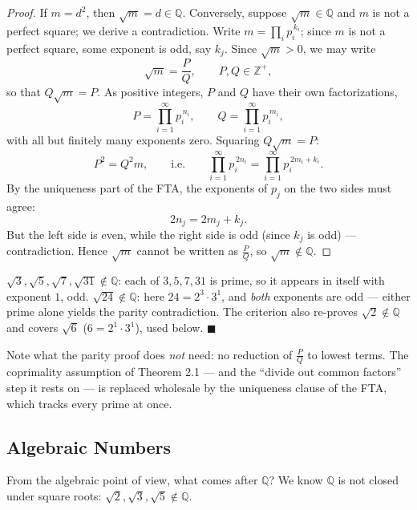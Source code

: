 \documentclass[11pt]{report}
\begin{document}
\begin{proof}
If $m = d^2$, then $\sqrt m = d \in \mathbb{Q}$. Conversely, suppose $\sqrt m \in \mathbb{Q}$ and $m$ is not a perfect square; we derive a contradiction. Write $m = \prod_i p_i^{\,k_i}$; since $m$ is not a perfect square, some exponent is odd, say $k_j$. Since $\sqrt m > 0$, we may write
\[
\sqrt m = \frac{P}{Q}, \qquad P, Q \in \mathbb{Z}^+,
\]
so that $Q\sqrt m = P$. As positive integers, $P$ and $Q$ have their own factorizations,
\[
P = \prod_{i=1}^\infty p_i^{\,n_i}, \qquad Q = \prod_{i=1}^\infty p_i^{\,m_i},
\]
with all but finitely many exponents zero. Squaring $Q\sqrt m = P$:
\[
P^2 = Q^2 m, \qquad \text{i.e.} \qquad \prod_{i=1}^\infty p_i^{\,2n_i} = \prod_{i=1}^\infty p_i^{\,2m_i + k_i}.
\]
By the uniqueness part of the FTA, the exponents of $p_j$ on the two sides must agree:
\[
2n_j = 2m_j + k_j.
\]
But the left side is even, while the right side is odd (since $k_j$ is odd) --- contradiction. Hence $\sqrt m$ cannot be written as $\tfrac PQ$, so $\sqrt m \notin \mathbb{Q}$.
\end{proof}

\begin{exbox}[Instances (HW)]
$\sqrt3, \sqrt5, \sqrt7, \sqrt{31} \notin \mathbb{Q}$: each of $3, 5, 7, 31$ is prime, so it appears in itself with exponent $1$, odd. $\sqrt{24} \notin \mathbb{Q}$: here $24 = 2^3 \cdot 3^1$, and \emph{both} exponents are odd --- either prime alone yields the parity contradiction. The criterion also re-proves $\sqrt2 \notin \mathbb{Q}$ and covers $\sqrt6$ ($6 = 2^1\cdot3^1$), used below. \hfill $\blacksquare$
\end{exbox}

\begin{rembox}
Note what the parity proof does \emph{not} need: no reduction of $\tfrac PQ$ to lowest terms. The coprimality assumption of Theorem 2.1 --- and the ``divide out common factors'' step it rests on --- is replaced wholesale by the uniqueness clause of the FTA, which tracks every prime at once.
\end{rembox}

\subsection{Algebraic Numbers}

From the algebraic point of view, what comes after $\mathbb{Q}$? We know $\mathbb{Q}$ is not closed under square roots: $\sqrt{2}, \sqrt{3}, \sqrt{5} \notin \mathbb{Q}$.
\end{document}
